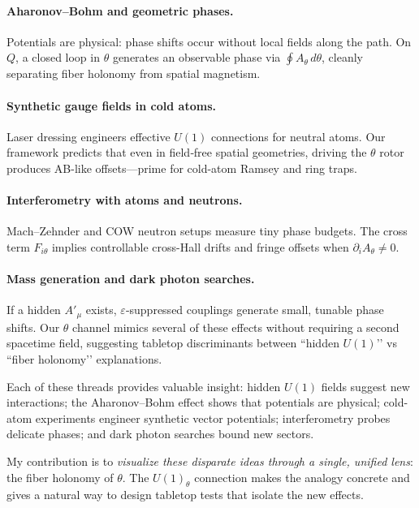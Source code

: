 \paragraph{Aharonov--Bohm and geometric phases.}
Potentials are physical: phase shifts occur without local fields along the path.
On $Q$, a closed loop in $\theta$ generates an observable phase via $\oint A_\theta\,d\theta$, cleanly separating fiber holonomy from spatial magnetism.

\paragraph{Synthetic gauge fields in cold atoms.}
Laser dressing engineers effective $U(1)$ connections for neutral atoms.
Our framework predicts that even in field‐free spatial geometries, driving the $\theta$ rotor produces AB-like offsets—prime for cold-atom Ramsey and ring traps.

\paragraph{Interferometry with atoms and neutrons.}
Mach–Zehnder and COW neutron setups measure tiny phase budgets.
The cross term $F_{i\theta}$ implies controllable cross-Hall drifts and fringe offsets when $\partial_i A_\theta\neq 0$.

\paragraph{Mass generation and dark photon searches.}
If a hidden $A'_\mu$ exists, $\varepsilon$-suppressed couplings generate small, tunable phase shifts.
Our $\theta$ channel mimics several of these effects without requiring a second spacetime field, suggesting tabletop discriminants between ``hidden $U(1)$’’ vs ``fiber holonomy’’ explanations.


Each of these threads provides valuable insight: hidden $U(1)$ fields suggest new interactions;
the Aharonov--Bohm effect shows that potentials are physical; cold-atom experiments engineer 
synthetic vector potentials; interferometry probes delicate phases; and dark photon searches 
bound new sectors.

My contribution is to \emph{visualize these disparate ideas through a single, unified lens}: 
the fiber holonomy of $\theta$. The $U(1)_\theta$ connection makes the analogy concrete and 
gives a natural way to design tabletop tests that isolate the new effects.
